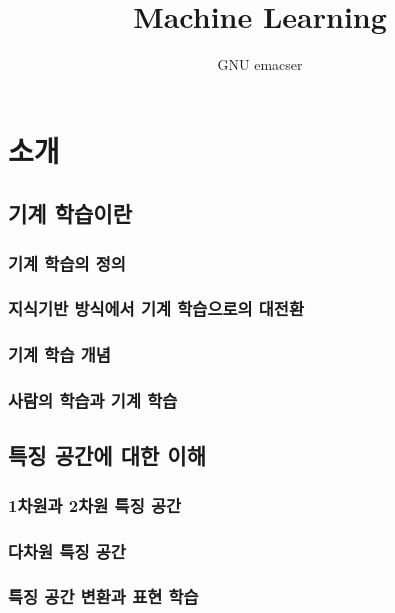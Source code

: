 \documentclass [12pt] {oblivoir}
\title{Machine Learning}
\author{GNU emacser}
\date{}
\let\oldsubsubsection=\subsubsection
\renewcommand{\subsubsection}
{
  \filbreak
  \oldsubsubsection
}
\begin{document}
\maketitle

\newpage
\tableofcontents

\newpage
\section{소개}

\subsection{기계 학습이란}

\subsubsection{기계 학습의 정의}

\subsubsection{지식기반 방식에서 기계 학습으로의 대전환}

\subsubsection{기계 학습 개념}

\subsubsection{사람의 학습과 기계 학습}

\subsection{특징 공간에 대한 이해}

\subsubsection{1차원과 2차원 특징 공간}

\subsubsection{다차원 특징 공간}

\subsubsection{특징 공간 변환과 표현 학습}
\end{document}
